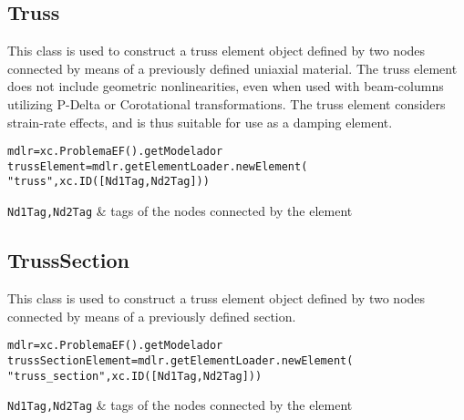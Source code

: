 \subsection{Truss}
This class is used to construct a truss element object defined by two nodes connected by means of a previously defined uniaxial material.
The truss element does not include geometric nonlinearities, even when used with beam-columns utilizing P-Delta or Corotational transformations.
The truss element considers strain-rate effects, and is thus suitable for use as a damping element. 
\begin{verbatim}
mdlr=xc.ProblemaEF().getModelador
trussElement=mdlr.getElementLoader.newElement(
"truss",xc.ID([Nd1Tag,Nd2Tag]))
\end{verbatim}
\begin{paramFuncTable}
{\tt Nd1Tag,Nd2Tag} & tags of the nodes connected by the element\\
\end{paramFuncTable}

\begin{paramClassTable}
\ElementParam{}
\ElementOneDParam{}
\end{paramClassTable}

\begin{methodsTable}
\ElementMeth{}
\ElementOneDMeth{}
\ProtoTrussMeth{}
\TrussBaseMeth{}
\TrussMeth{}
\end{methodsTable}


\subsection{TrussSection}
This class is used to construct a truss element object defined by two nodes connected by means of a previously defined section.
\begin{verbatim}
mdlr=xc.ProblemaEF().getModelador
trussSectionElement=mdlr.getElementLoader.newElement(
"truss_section",xc.ID([Nd1Tag,Nd2Tag]))
\end{verbatim}
\begin{paramFuncTable}
{\tt Nd1Tag,Nd2Tag} & tags of the nodes connected by the element\\
\end{paramFuncTable}

\begin{paramClassTable}
\ElementParam{}
\ElementOneDParam{}
\end{paramClassTable}

\begin{methodsTable}
\ElementMeth{}
\ElementOneDMeth{}
\ProtoTrussMeth{}
\TrussBaseMeth{}
\end{methodsTable}

